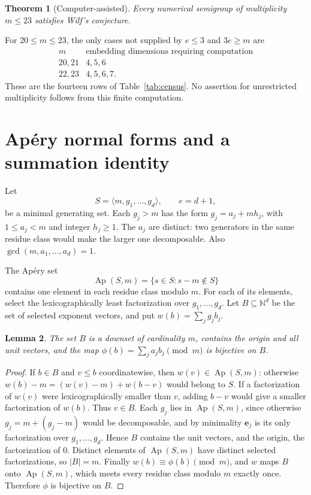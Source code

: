 \documentclass[11pt]{article}
\newtheorem{theorem}{Theorem}[section]
\newtheorem{lemma}[theorem]{Lemma}
\theoremstyle{definition}
\theoremstyle{remark}
\newcommand{\N}{\mathbb{N}}
\newcommand{\Ap}{\operatorname{Ap}}
\begin{document}
\begin{theorem}[Computer-assisted]\label{thm:main}
Every numerical semigroup of multiplicity $m\le23$ satisfies Wilf's
conjecture.
\end{theorem}

For $20\le m\le23$, the only cases not supplied by $e\le3$ and
$3e\ge m$ are
\[
\begin{array}{c|c}
m&\text{embedding dimensions requiring computation}\\ \hline
20,21&4,5,6\\
22,23&4,5,6,7.
\end{array}
\]
These are the fourteen rows of Table~\ref{tab:census}. No assertion for
unrestricted multiplicity follows from this finite computation.

\section{Ap\'ery normal forms and a summation identity}

Let
\[
S=\langle m,g_1,\ldots,g_d\rangle,\qquad e=d+1,
\]
be a minimal generating set. Each $g_j>m$ has the form
$g_j=a_j+mh_j$, with $1\le a_j<m$ and integer $h_j\ge1$.
The $a_j$ are distinct: two generators in the same residue class would
make the larger one decomposable. Also $\gcd(m,a_1,\ldots,a_d)=1$.

The Ap\'ery set
\[
\Ap(S,m)=\{s\in S:s-m\notin S\}
\]
contains one element in each residue class modulo $m$. For each of its
elements, select the lexicographically least factorization over
$g_1,\ldots,g_d$. Let $B\subseteq\N^d$ be the set of selected exponent
vectors, and put $w(b)=\sum_jg_jb_j$.

\begin{lemma}\label{lem:normal}
The set $B$ is a downset of cardinality $m$, contains the origin and all
unit vectors, and the map
$\phi(b)=\sum_ja_jb_j\pmod m$ is bijective on $B$.
\end{lemma}
\begin{proof}
If $b\in B$ and $v\le b$ coordinatewise, then $w(v)\in\Ap(S,m)$:
otherwise $w(b)-m=(w(v)-m)+w(b-v)$ would belong to $S$.
If a factorization of $w(v)$ were lexicographically smaller than $v$,
adding $b-v$ would give a smaller factorization of $w(b)$.
Thus $v\in B$. Each $g_j$ lies in $\Ap(S,m)$, since otherwise
$g_j=m+(g_j-m)$ would be decomposable, and by minimality $\mathbf e_j$
is its only factorization over $g_1,\ldots,g_d$. Hence $B$ contains the
unit vectors, and the origin, the factorization of $0$. Distinct
elements of $\Ap(S,m)$ have distinct selected factorizations, so
$|B|=m$. Finally $w(b)\equiv\phi(b)\pmod m$, and $w$ maps $B$ onto
$\Ap(S,m)$, which meets every residue class modulo $m$ exactly once.
Therefore $\phi$ is bijective on $B$.
\end{proof}
\end{document}
